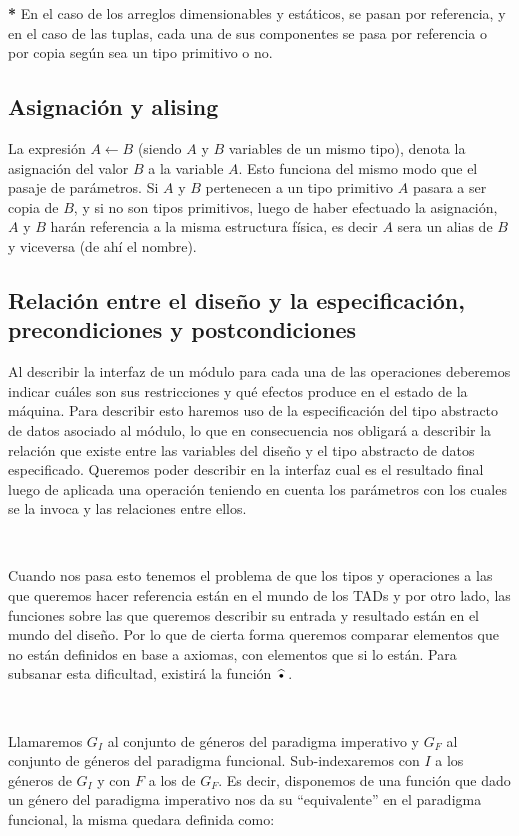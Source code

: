 \documentclass[10pt, a4paper]{report}
\begin{document}
\textbf{*} En el caso de los arreglos dimensionables y est\'aticos, se pasan por referencia, y en el caso de las tuplas, cada una de sus componentes se pasa por referencia o por copia seg\'un sea un tipo primitivo o no.

\subsection{Asignaci\'on y alising}

La expresi\'on $A \gets B$ (siendo $A$ y $B$ variables de un mismo tipo), denota la asignaci\'on del valor $B$ a la variable $A$. Esto funciona del mismo modo que el pasaje de par\'ametros. Si $A$ y $B$ pertenecen a un tipo primitivo $A$ pasara a ser copia de $B$, y si no son tipos primitivos, luego de haber efectuado la asignaci\'on, $A$ y $B$ har\'an referencia a la misma estructura f\'isica, es decir $A$ sera un alias de $B$ y viceversa (de ah\'i el nombre).

\subsection{Relaci\'on entre el dise\~no y la especificaci\'on, precondiciones y postcondiciones}

Al describir la interfaz de un m\'odulo para cada una de las operaciones deberemos indicar cu\'ales son sus restricciones y qu\'e efectos produce en el estado de la m\'aquina. Para describir esto haremos uso de la especificaci\'on del tipo abstracto de datos asociado al m\'odulo, lo que en consecuencia nos obligar\'a a describir la relaci\'on que existe entre las variables del dise\~no y el tipo abstracto de datos especificado. Queremos poder describir en la interfaz cual es el resultado final luego de aplicada una operaci\'on teniendo en cuenta los par\'ametros con los cuales se la invoca y las relaciones entre ellos.

~

Cuando nos pasa esto tenemos el problema de que los tipos y operaciones a las que queremos hacer referencia est\'an en el mundo de los TADs y por otro lado, las funciones sobre las que queremos describir su entrada y resultado est\'an en el mundo del dise\~no. Por lo que de cierta forma queremos comparar elementos que no est\'an definidos en base a axiomas, con elementos que si lo est\'an. Para subsanar esta dificultad, existir\'a la funci\'on $\widehat{\text{\textbullet}}$.

~

Llamaremos $G_I$ al conjunto de g\'eneros del paradigma imperativo y $G_F$ al conjunto de g\'eneros del paradigma funcional. Sub-indexaremos con $I$ a los g\'eneros de $G_I$ y con $F$ a los de $G_F$. Es decir, disponemos de una funci\'on que dado un g\'enero del paradigma imperativo nos da su ``equivalente'' en el paradigma funcional, la misma quedara definida como:
\end{document}
